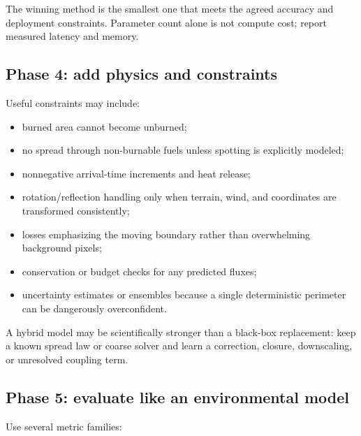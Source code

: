\documentclass[11pt]{article}
\begin{document}
The winning method is the smallest one that meets the agreed accuracy and deployment constraints. Parameter count alone is not compute cost; report measured latency and memory.

\subsection{Phase 4: add physics and constraints}

Useful constraints may include:
\begin{itemize}
  \item burned area cannot become unburned;
  \item no spread through non-burnable fuels unless spotting is explicitly modeled;
  \item nonnegative arrival-time increments and heat release;
  \item rotation/reflection handling only when terrain, wind, and coordinates are transformed consistently;
  \item losses emphasizing the moving boundary rather than overwhelming background pixels;
  \item conservation or budget checks for any predicted fluxes;
  \item uncertainty estimates or ensembles because a single deterministic perimeter can be dangerously overconfident.
\end{itemize}

A hybrid model may be scientifically stronger than a black-box replacement: keep a known spread law or coarse solver and learn a correction, closure, downscaling, or unresolved coupling term.

\subsection{Phase 5: evaluate like an environmental model}

Use several metric families:
\end{document}
